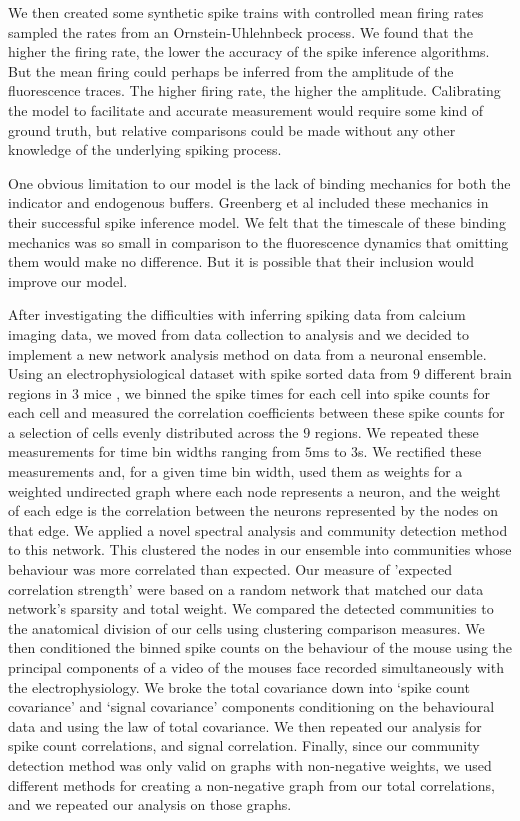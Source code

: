 We then created some synthetic spike trains with controlled mean firing rates sampled the rates from an Ornstein-Uhlehnbeck process. We found that the higher the firing rate, the lower the accuracy of the spike inference algorithms. But the mean firing could perhaps be inferred from the amplitude of the fluorescence traces. The higher firing rate, the higher the amplitude. Calibrating the model to facilitate and accurate measurement would require some kind of ground truth, but relative comparisons could be made without any other knowledge of the underlying spiking process.

One obvious limitation to our model is the lack of binding mechanics for both the indicator and endogenous buffers. Greenberg et al included these mechanics in their successful spike inference model. We felt that the timescale of these binding mechanics was so small in comparison to the fluorescence dynamics that omitting them would make no difference. But it is possible that their inclusion would improve our model.

After investigating the difficulties with inferring spiking data from calcium imaging data, we moved from data collection to analysis and we decided to implement a new network analysis method on data from a neuronal ensemble. Using an electrophysiological dataset with spike sorted data from $9$ different brain regions in $3$ mice \parencite{steinmetz}, we binned the spike times for each cell into spike counts for each cell and measured the correlation coefficients between these spike counts for a selection of cells evenly distributed across the $9$ regions. We repeated these measurements for time bin widths ranging from $5$ms to $3$s. We rectified these measurements and, for a given time bin width, used them as weights for a weighted undirected graph where each node represents a neuron, and the weight of each edge is the correlation between the neurons represented by the nodes on that edge. We applied a novel spectral analysis and community detection method \parencite{humphries} to this network. This clustered the nodes in our ensemble into communities whose behaviour was more correlated than expected. Our measure of 'expected correlation strength' were based on a random network that matched our data network's sparsity and total weight. We compared the detected communities to the anatomical division of our cells using clustering comparison measures. We then conditioned the binned spike counts on the behaviour of the mouse using the principal components of a video of the mouses face recorded simultaneously with the electrophysiology. We broke the total covariance down into `spike count covariance' and `signal covariance' components  conditioning on the behavioural data and using the law of total covariance. We then repeated our analysis for spike count correlations, and signal correlation. Finally, since our community detection method was only valid on graphs with non-negative weights, we used different methods for creating a non-negative graph from our total correlations, and we repeated our analysis on those graphs.

